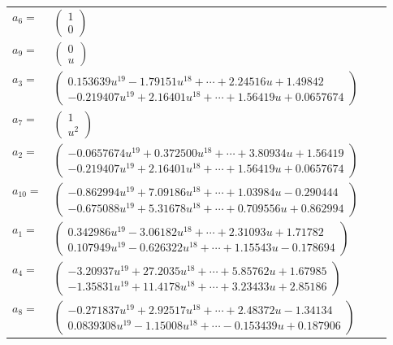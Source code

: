 \documentclass[1p]{elsarticle_modified}
\theoremstyle{definition}
\begin{document}
\begin{tabular}{m{7pt} m{180pt} m{7pt} m{180pt} }
\flushright $a_{6}=$&$\begin{pmatrix}1\\0\end{pmatrix}$ \\
\flushright $a_{9}=$&$\begin{pmatrix}0\\u\end{pmatrix}$ \\
\flushright $a_{3}=$&$\begin{pmatrix}0.153639 u^{19}-1.79151 u^{18}+\cdots+2.24516 u+1.49842\\-0.219407 u^{19}+2.16401 u^{18}+\cdots+1.56419 u+0.0657674\end{pmatrix}$ \\
\flushright $a_{7}=$&$\begin{pmatrix}1\\u^2\end{pmatrix}$ \\
\flushright $a_{2}=$&$\begin{pmatrix}-0.0657674 u^{19}+0.372500 u^{18}+\cdots+3.80934 u+1.56419\\-0.219407 u^{19}+2.16401 u^{18}+\cdots+1.56419 u+0.0657674\end{pmatrix}$ \\
\flushright $a_{10}=$&$\begin{pmatrix}-0.862994 u^{19}+7.09186 u^{18}+\cdots+1.03984 u-0.290444\\-0.675088 u^{19}+5.31678 u^{18}+\cdots+0.709556 u+0.862994\end{pmatrix}$ \\
\flushright $a_{1}=$&$\begin{pmatrix}0.342986 u^{19}-3.06182 u^{18}+\cdots+2.31093 u+1.71782\\0.107949 u^{19}-0.626322 u^{18}+\cdots+1.15543 u-0.178694\end{pmatrix}$ \\
\flushright $a_{4}=$&$\begin{pmatrix}-3.20937 u^{19}+27.2035 u^{18}+\cdots+5.85762 u+1.67985\\-1.35831 u^{19}+11.4178 u^{18}+\cdots+3.23433 u+2.85186\end{pmatrix}$ \\
\flushright $a_{8}=$&$\begin{pmatrix}-0.271837 u^{19}+2.92517 u^{18}+\cdots+2.48372 u-1.34134\\0.0839308 u^{19}-1.15008 u^{18}+\cdots-0.153439 u+0.187906\end{pmatrix}$ \\

\end{tabular}
\end{document}
